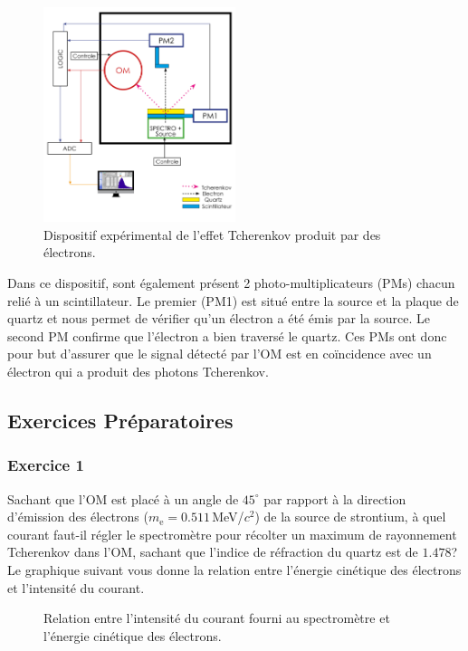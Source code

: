 \begin{figure}[!h]
    \centering
    \includegraphics[width=0.5\textwidth]{figures/Dispositif_1.png}
    \caption{Dispositif expérimental de l'effet Tcherenkov produit par des électrons.}
    \label{fig:dispo1} 
\end{figure}

Dans ce dispositif, sont également présent 2 photo-multiplicateurs (PMs) chacun relié à un scintillateur. Le premier (PM1) est situé entre la source et la plaque de quartz et nous permet de vérifier qu'un électron a été émis par la source. Le second PM confirme que l'électron a bien traversé le quartz. Ces PMs ont donc pour but d'assurer que le signal détecté par l'OM est en coïncidence avec un électron qui a produit des photons Tcherenkov.


\subsection{Exercices Pr\'eparatoires}

\subsubsection{Exercice 1}
Sachant que l'OM est placé à un angle de $45^\circ$ par rapport à la direction d'émission des électrons ($m_\mathrm{e} = 0.511$\,MeV/$c^2$) de la source de strontium, à quel courant faut-il régler le spectromètre pour récolter un maximum de rayonnement Tcherenkov dans l'OM, sachant que l'indice de réfraction du quartz est de $1.478$?\\

Le graphique suivant vous donne la relation entre l'énergie cinétique des électrons et l'intensité du courant.

\begin{figure}[!h]
    \caption{\label{fig:spectro} Relation entre l'intensité du courant fourni au spectromètre et l'énergie cinétique des électrons.}
\end{figure}

